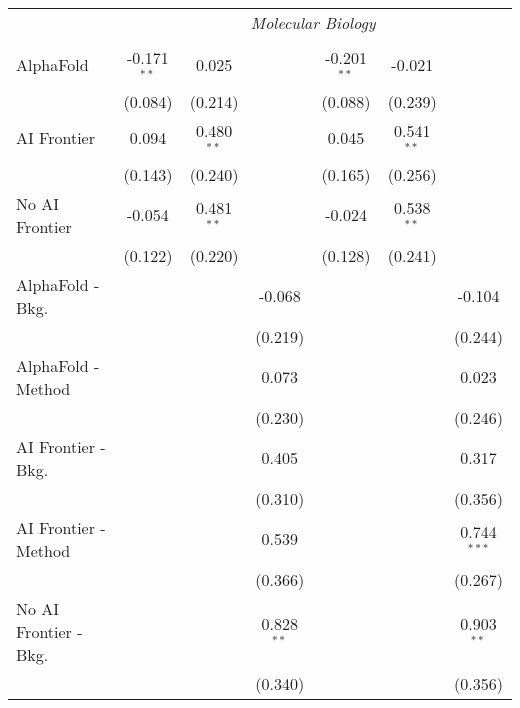 \begin{tabular}{lcccccc}
 & \multicolumn{6}{c}{\textit{Molecular Biology}} \\ \\
   AlphaFold               & -0.171$^{**}$ & 0.025        &              & -0.201$^{**}$ & -0.021       &   \\   
                           & (0.084)       & (0.214)      &              & (0.088)       & (0.239)      &   \\   
   AI Frontier             & 0.094         & 0.480$^{**}$ &              & 0.045         & 0.541$^{**}$ &   \\   
                           & (0.143)       & (0.240)      &              & (0.165)       & (0.256)      &   \\   
   No AI Frontier          & -0.054        & 0.481$^{**}$ &              & -0.024        & 0.538$^{**}$ &   \\   
                           & (0.122)       & (0.220)      &              & (0.128)       & (0.241)      &   \\   
   AlphaFold - Bkg.        &               &              & -0.068       &               &              & -0.104\\   
                           &               &              & (0.219)      &               &              & (0.244)\\   
   AlphaFold - Method      &               &              & 0.073        &               &              & 0.023\\   
                           &               &              & (0.230)      &               &              & (0.246)\\   
   AI Frontier - Bkg.      &               &              & 0.405        &               &              & 0.317\\   
                           &               &              & (0.310)      &               &              & (0.356)\\   
   AI Frontier - Method    &               &              & 0.539        &               &              & 0.744$^{***}$\\   
                           &               &              & (0.366)      &               &              & (0.267)\\   
   No AI Frontier - Bkg.   &               &              & 0.828$^{**}$ &               &              & 0.903$^{**}$\\   
                           &               &              & (0.340)      &               &              & (0.356)\\   

\end{tabular}
